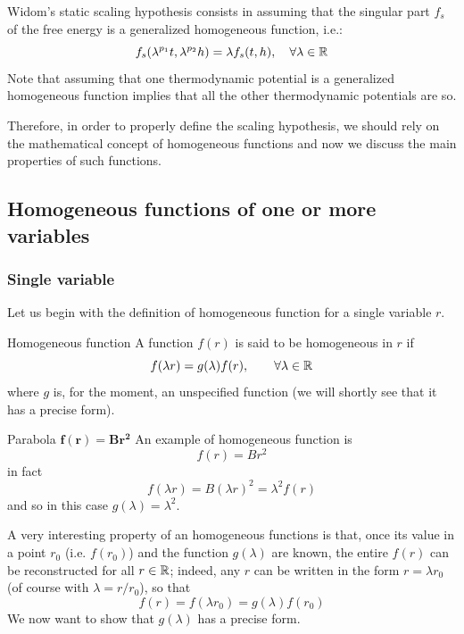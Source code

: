 \documentclass[../main/main.tex]{subfiles}
\begin{document}
Widom's static scaling hypothesis consists in assuming that the singular part \( f_s \) of the free energy is a generalized homogeneous function, i.e.:
\begin{equation*}
  f_s (\lambda ^{p_1}t, \lambda ^{p_2} h) = \lambda f _s (t,h), \quad \forall \lambda \in \mathbb{R}
\end{equation*}
Note that assuming that one thermodynamic potential is a generalized homogeneous function implies that all the other thermodynamic potentials are so.

Therefore, in order to properly define the scaling hypothesis, we should rely on the mathematical concept of homogeneous functions and now we discuss the main properties of such functions.



\subsection{Homogeneous functions of one or more variables}

\subsubsection{Single variable}
Let us begin with the definition of homogeneous function for a single variable \( r \).
\begin{definition}{Homogeneous function}{}
A function \( f(r) \) is said to be homogeneous in \( r \) if
\begin{equation}
  f (\lambda r) = g (\lambda ) f(r), \qquad \forall \lambda \in \mathbb{R}
\end{equation}
where \( g \) is, for the moment, an unspecified function (we will shortly see that it has a precise form).
\end{definition}
\begin{example}{Parabola \( \pmb{ f(r) = B r^2} \) }{}
  An example of homogeneous function is
\begin{equation*}
  f(r) = B r^2
\end{equation*}
in fact
\begin{equation*}
  f ( \lambda r) = B ( \lambda r)^2 = \lambda ^2 f (r)
\end{equation*}
and so in this case \( g ( \lambda ) = \lambda ^2 \).
\end{example}

A very interesting property of an homogeneous functions is that,  once its value in a point \( r_0 \) (i.e. \( f(r_0) \)) and the function \( g(\lambda ) \) are known,
the entire \( f(r) \) can be reconstructed for all \( r \in \mathbb{R} \); indeed, any \( r \) can be written in the form \( r=\lambda r_0 \) (of course with \( \lambda = r / r_0 \)), so that
\begin{equation}
  f(r) = f (\lambda r_0) = g(\lambda ) f(r_0)
\end{equation}
We now want to show that \( g (\lambda ) \)  has a precise form.
\end{document}

